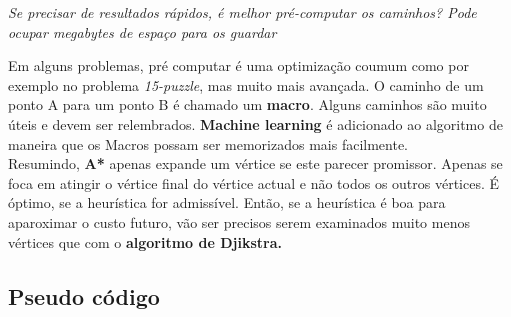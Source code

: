 \documentclass[a4paper]{article}
\begin{document}
\textit{Se precisar de resultados rápidos, é melhor pré-computar os caminhos? Pode ocupar megabytes de espaço para os guardar}


Em alguns problemas, pré computar é uma optimização coumum como por exemplo no problema \textit{15-puzzle}, mas muito mais avançada. O caminho de um ponto A para um ponto B é chamado um \textbf{macro}. Alguns caminhos são muito úteis e devem ser relembrados. \textbf{Machine learning} é adicionado ao algoritmo de maneira que os Macros possam ser memorizados mais facilmente.\\

Resumindo, \textbf{A*} apenas expande um vértice se este parecer promissor. Apenas se foca em atingir o vértice final do vértice actual e não todos os outros vértices. É óptimo, se a heurística for admissível. Então, se a heurística é boa para aparoximar o custo futuro, vão ser precisos serem examinados muito menos vértices que com o \textbf{algoritmo de Djikstra.}

\subsection{Pseudo código}
\end{document}
